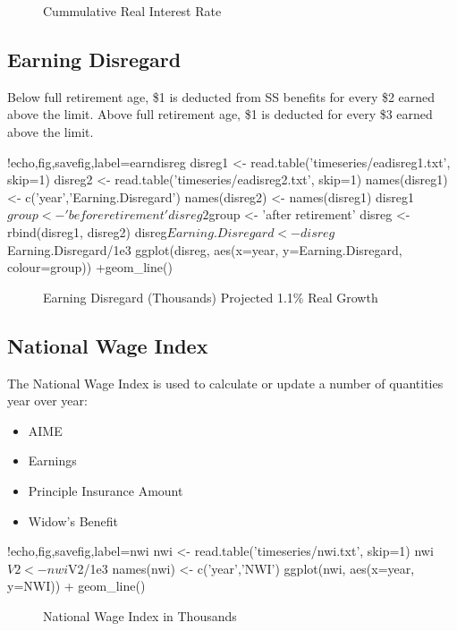 \documentclass{article}
\begin{document}
\begin{figure}[h]
\centering
{}
\caption{Cummulative Real Interest Rate}
\label{fig:interest}
\end{figure}

\subsection{Earning Disregard}
Below full retirement age, \$1 is deducted from SS benefits for every
\$2 earned above the limit. Above full retirement age, \$1 is deducted
for every \$3 earned above the limit.

\begin{Rcode}{!echo,fig,savefig,label=earndisreg}
disreg1 <- read.table('timeseries/eadisreg1.txt', skip=1)
disreg2 <- read.table('timeseries/eadisreg2.txt', skip=1)
names(disreg1) <- c('year','Earning.Disregard')
names(disreg2) <- names(disreg1)
disreg1$group <- 'before retirement'
disreg2$group <- 'after retirement'
disreg <- rbind(disreg1, disreg2)
disreg$Earning.Disregard <- disreg$Earning.Disregard/1e3
ggplot(disreg, aes(x=year, y=Earning.Disregard, colour=group)) +geom_line()
\end{Rcode}

\begin{figure}[h]
\centering
{}
\caption{Earning Disregard (Thousands) Projected 1.1\% Real Growth}
\label{fig:earndisreg}
\end{figure}

\subsection{National Wage Index}
The National Wage Index is used to calculate or update a number of quantities year
over year:
\begin{itemize}
\item AIME
\item Earnings
\item Principle Insurance Amount
\item Widow's Benefit
\end{itemize}

\begin{Rcode}{!echo,fig,savefig,label=nwi}
nwi <- read.table('timeseries/nwi.txt', skip=1)
nwi$V2 <- nwi$V2/1e3
names(nwi) <- c('year','NWI')
ggplot(nwi, aes(x=year, y=NWI)) + geom_line()
\end{Rcode}

\begin{figure}[h]
\centering
{}
\caption{National Wage Index in Thousands}
\label{fig:nwi}
\end{figure}
\end{document}
